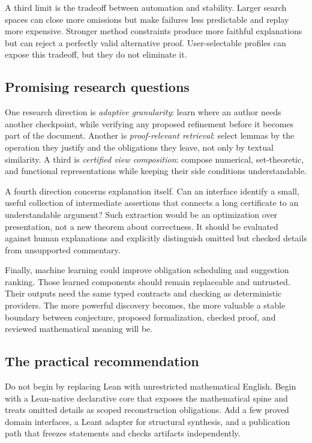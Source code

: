 \documentclass[11pt,a4paper]{article}
\theoremstyle{definition}
\theoremstyle{remark}
\begin{document}
A third limit is the tradeoff between automation and stability. Larger search spaces can close more omissions but make failures less predictable and replay more expensive. Stronger method constraints produce more faithful explanations but can reject a perfectly valid alternative proof. User-selectable profiles can expose this tradeoff, but they do not eliminate it.

\subsection{Promising research questions}
One research direction is \emph{adaptive granularity}: learn where an author needs another checkpoint, while verifying any proposed refinement before it becomes part of the document. Another is \emph{proof-relevant retrieval}: select lemmas by the operation they justify and the obligations they leave, not only by textual similarity. A third is \emph{certified view composition}: compose numerical, set-theoretic, and functional representations while keeping their side conditions understandable.

A fourth direction concerns explanation itself. Can an interface identify a small, useful collection of intermediate assertions that connects a long certificate to an understandable argument? Such extraction would be an optimization over presentation, not a new theorem about correctness. It should be evaluated against human explanations and explicitly distinguish omitted but checked details from unsupported commentary.

Finally, machine learning could improve obligation scheduling and suggestion ranking. Those learned components should remain replaceable and untrusted. Their outputs need the same typed contracts and checking as deterministic providers. The more powerful discovery becomes, the more valuable a stable boundary between conjecture, proposed formalization, checked proof, and reviewed mathematical meaning will be.

\subsection{The practical recommendation}
Do not begin by replacing Lean with unrestricted mathematical English. Begin with a Lean-native declarative core that exposes the mathematical spine and treats omitted details as scoped reconstruction obligations. Add a few proved domain interfaces, a Leant adapter for structural synthesis, and a publication path that freezes statements and checks artifacts independently.
\end{document}
